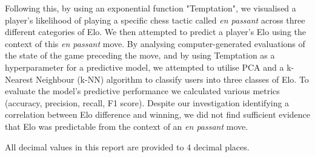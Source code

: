 \documentclass[10pt,a4paper]{article}
\begin{document}
Following this, by using an exponential function "Temptation", we visualised a player's likelihood of playing a specific chess tactic called \textit{en passant} across three different categories of Elo. We then attempted to predict a player's Elo using the context of this \textit{en passant} move. By analysing computer-generated evaluations of the state of the game preceding the move, and by using Temptation as a hyperparameter for a predictive model, we attempted to utilise PCA and a k-Nearest Neighbour (k-NN) algorithm to classify users into three classes of Elo. To evaluate the model's predictive performance we calculated various metrics (accuracy, precision, recall, F1 score). Despite our investigation identifying a correlation between Elo difference and winning, we did not find sufficient evidence that Elo was predictable from the context of an \textit{en passant} move. \newline

All decimal values in this report are provided to 4 decimal places.
\end{document}
